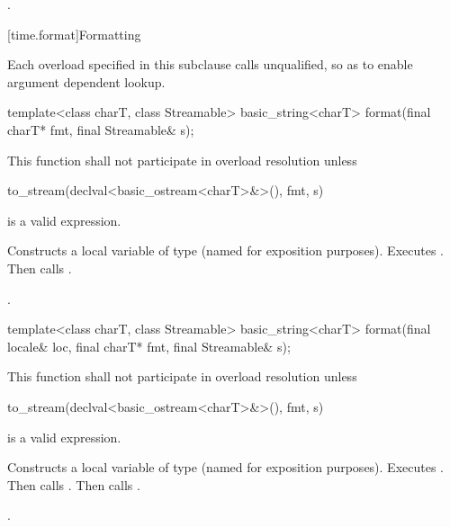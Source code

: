 \begin{itemdescr}
\pnum
\returns {}.
\end{itemdescr}

[time.format]{Formatting}

\pnum
Each  overload specified in this subclause
calls  unqualified,
so as to enable argument dependent lookup.

%
\begin{itemdecl}
template<class charT, class Streamable>
  basic_string<charT>
    format(final charT* fmt, final Streamable& s);
\end{itemdecl}

\begin{itemdescr}
\pnum
\remarks
This function shall not participate in overload resolution unless
\begin{codeblock}
to_stream(declval<basic_ostream<charT>&>(), fmt, s)
\end{codeblock}
is a valid expression.

\pnum
\effects
Constructs a local variable of type
(named  for exposition purposes).
Executes .
Then calls .

\pnum
\returns {}.
\end{itemdescr}

\begin{itemdecl}
template<class charT, class Streamable>
  basic_string<charT>
    format(final locale& loc, final charT* fmt, final Streamable& s);
\end{itemdecl}

\begin{itemdescr}
\pnum
\remarks
This function shall not participate in overload resolution unless
\begin{codeblock}
to_stream(declval<basic_ostream<charT>&>(), fmt, s)
\end{codeblock}
is a valid expression.

\pnum
\effects
Constructs a local variable of type
(named  for exposition purposes).
Executes .
Then calls .
Then calls .

\pnum
\returns {}.
\end{itemdescr}

